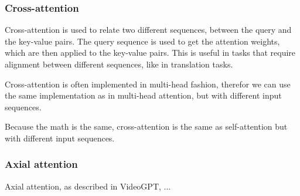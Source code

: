 \subsubsection{Cross-attention}

Cross-attention is used to relate two different sequences, between the query and the key-value pairs. The query sequence is used to get the attention weights, which are then applied to the key-value pairs. This is useful in tasks that require alignment between different sequences, like in translation tasks.

Cross-attention is often implemented in multi-head fashion, therefor we can use the same implementation as in multi-head attention, but with different input sequences.

Because the math is the same, cross-attention is the same as self-attention but with different input sequences.







\subsubsection{Axial attention}

Axial attention, as described in VideoGPT, ...












